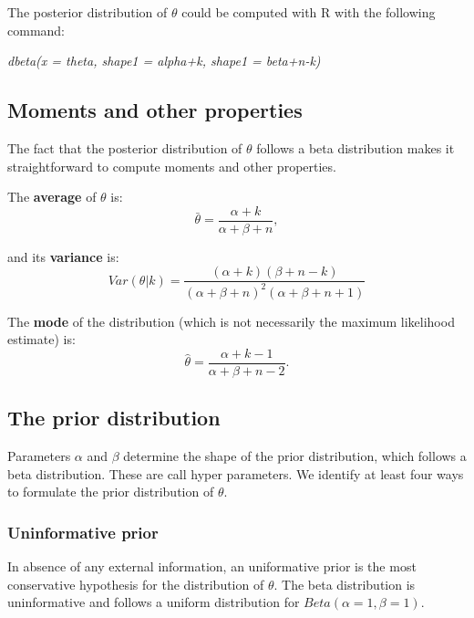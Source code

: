 \documentclass[12pt]{article}
\begin{document}
  The posterior distribution of $\theta$ could be computed with R with the following command:


  \vspace{12pt}
  \noindent\emph{dbeta(x = theta, shape1 = alpha+k, shape1 = beta+n-k)}
  \vspace{12pt}


  \subsection*{Moments and other properties}

  The fact that the posterior distribution of $\theta$ follows a beta distribution makes it straightforward to compute moments and other properties. 

  The \textbf{average} of $\theta$ is: 
      \begin{equation}
        \bar{\theta} = \frac{\alpha+k}{\alpha+\beta+n} ,
        \label{mean}
      \end{equation}


    and its \textbf{variance} is:  
      \begin{equation}
        Var(\theta|k) = \frac{(\alpha + k)(\beta + n - k)}{(\alpha + \beta + n)^{2}(\alpha + \beta + n +1)}
        \label{variance}
      \end{equation}


    The \textbf{mode} of the distribution (which is not necessarily the maximum likelihood estimate) is:
      \begin{equation}
        \hat{\theta} = \frac{\alpha + k - 1}{\alpha + \beta + n - 2} .
        \label{mode}
      \end{equation}


  \subsection*{The prior distribution}
    
  Parameters $\alpha$ and $\beta$ determine the shape of the prior distribution, which follows a beta distribution. These are call hyper parameters. We identify at least four ways to formulate the prior distribution of $\theta$. 


    \subsubsection*{Uninformative prior}
      
      In absence of any external information, an uniformative prior is the most conservative 
      hypothesis for the distribution of $\theta$. The beta distribution is uninformative and follows 
      a uniform distribution for $Beta(\alpha=1,\beta=1)$. 
\end{document}
